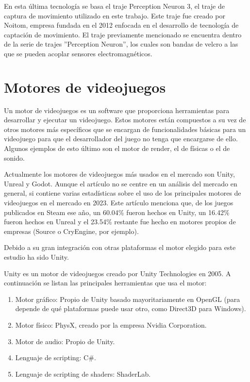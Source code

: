 En esta última tecnología se basa el traje Perception Neuron 3, el traje de captura de movimiento utilizado en este trabajo.
Este traje fue creado por Noitom, empresa fundada en el 2012 enfocada en el desarrollo de tecnología de captación de movimiento.
El traje previamente mencionado se encuentra dentro de la serie de trajes ''Perception Neuron'', los cuales son bandas de velcro a las que se pueden acoplar sensores electromagnéticos.

\section{Motores de videojuegos}
Un motor de videojuegos es un software que proporciona herramientas para desarrollar y ejecutar un videojuego.
Estos motores están compuestos a su vez de otros motores más específicos que se encargan de funcionalidades básicas para un videojuego para que el desarrollador del juego no tenga que encargarse de ello. Algunos ejemplos de esto último son el motor de render, el de físicas o el de sonido.

Actualmente los motores de videojuegos más usados en el mercado son Unity, Unreal y Godot.
Aunque el artículo \cite{SGE} no se centre en un análisis del mercado en general, si contiene varias estadísticas sobre el uso de los principales motores de videojuegos en el mercado en 2023.
Este artículo menciona que, de los juegos publicados en Steam ese año, un 60.04\% fueron hechos en Unity, un 16.42\% fueron hechos en Unreal y el 23.54\% restante fue hecho en motores propios de empresas (Source o CryEngine, por ejemplo).

Debido a su gran integración con otras plataformas el motor elegido para este estudio ha sido Unity.

Unity es un motor de videojuegos creado por Unity Technologies en 2005. A continuación se listan las principales herramientas que usa el motor:

\begin{enumerate}
    \item Motor gráfico: Propio de Unity basado mayoritariamente en OpenGL (para depende de qué plataformas puede usar otro, como Direct3D para Windows).
    \item Motor físico: PhysX, creado por la empresa Nvidia Corporation.
    \item Motor de audio: Propio de Unity.
    \item Lenguaje de scripting: C\#.
    \item Lenguaje de scripting de shaders: ShaderLab.
\end{enumerate}

